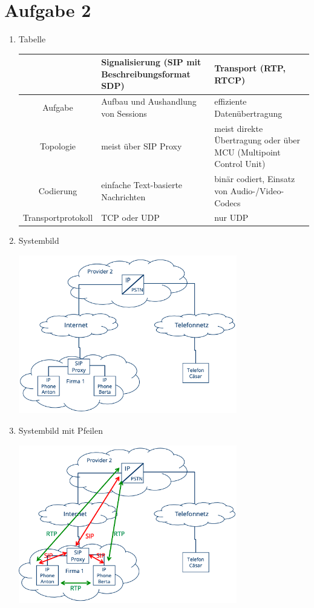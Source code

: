 \documentclass{article}
\begin{document}
	\section*{Aufgabe 2}
	\begin{enumerate}[label=(\alph*)]
		\item Tabelle
		\begin{center}
			\begin{tabular}{c|C{5cm}|C{5cm}}
				& \textbf{Signalisierung (SIP mit Beschreibungsformat SDP)} & \textbf{Transport (RTP, RTCP)} \\
				\hline
				Aufgabe & Aufbau und Aushandlung von Sessions & effiziente Datenübertragung \\
				\hline
				Topologie & meist über SIP Proxy & meist direkte Übertragung oder über MCU (Multipoint Control Unit) \\
				\hline
				Codierung & einfache Text-basierte Nachrichten & binär codiert, Einsatz von Audio-/Video-Codecs \\
				\hline
				Transportprotokoll & TCP oder UDP & nur UDP
			\end{tabular}
		\end{center}
		\item Systembild
		\begin{center}
			\includegraphics[width=0.75\textwidth]{./pics/Systembild}
		\end{center}
		\item Systembild mit Pfeilen
		\begin{center}
			\includegraphics[width=0.75\textwidth]{./pics/Systembild_Pfeile}
		\end{center}
	\end{enumerate}
\end{document}
